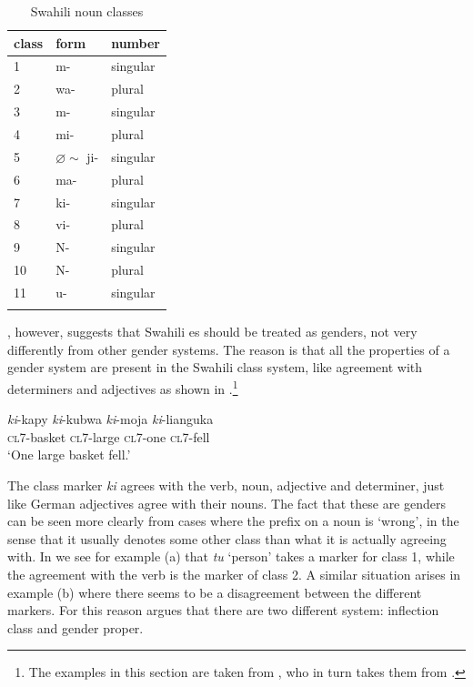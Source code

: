 \begin{table}
  \centering
  \begin{tabular}{lll}
    \lsptoprule
    class & form                   & number   \\
    \midrule
    1     & m-                     & singular \\
    2     & wa-                    & plural   \\
    3     & m-                     & singular \\
    4     & mi-                    & plural   \\
    5     & $\varnothing \sim$ ji- & singular \\
    6     & ma-                    & plural   \\
    7     & ki-                    & singular \\
    8     & vi-                    & plural   \\
    9     & N-                     & singular \\
    10    & N-                     & plural   \\
    11    & u-                     & singular \\
    \lspbottomrule
  \end{tabular}\caption{Swahili noun classes}\label{tab:swahili-classes}
\end{table}

\textcite{Corbett.1991}, however, suggests that Swahili es should be treated as genders, not very differently from other gender systems. The reason is that all the properties of a gender system are present in the Swahili class system, like agreement with determiners and adjectives as shown in .\footnote{The examples in this section are taken from \textcite{Corbett.1991}, who in turn takes them from \textcite[159-183]{Welmers.1973}.}

\begin{exe}
    \ex \label{swahili-class-exe}
    \gll \textit{ki}-kapy \textit{ki}-kubwa \textit{ki}-moja \textit{ki}-lianguka\\
    \textsc{cl7}-basket \textsc{cl7}-large \textsc{cl7}-one \textsc{cl7}-fell\\
    \glt `One large basket fell.'
\end{exe}

The class marker \textit{ki} agrees with the verb, noun, adjective and determiner, just like German adjectives agree with their nouns. The fact that these are genders can be seen more clearly from cases where the prefix on a noun is `wrong', in the sense that it usually denotes some other class than what it is actually agreeing with. In  \autocite[45]{Corbett.1991} we see for example (a) that \textit{tu} `person' takes a marker for class 1, while the agreement with the verb is the marker of class 2. A similar situation arises in example (b) where there seems to be a disagreement between the different markers. For this reason \textcite{Corbett.1991} argues that there are two different system: inflection class and gender proper.

